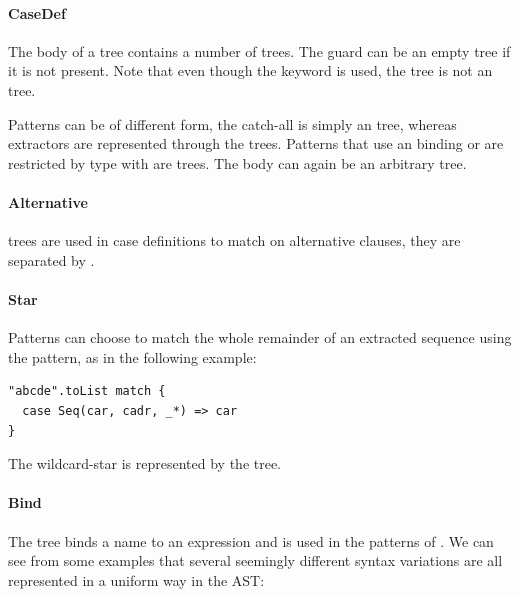 \paragraph{CaseDef} 

\noindent The body of a  tree contains a number of  trees. The guard can be an empty tree if it is not present. Note that even though the  keyword is used, the tree is not an  tree.

Patterns can be of different form, the catch-all \src{\_} is simply an  tree, whereas extractors are represented through the  trees. Patterns that use an  binding or are restricted by type with \src{:} are  trees. The body can again be an arbitrary tree.

\paragraph{Alternative} 

\noindent {} trees are used in case definitions to match on alternative clauses, they are separated by \src{|}.

\paragraph{Star} 

\noindent Patterns can choose to match the whole remainder of an extracted sequence using the \src{\_*} pattern, as in the following example:

\begin{lstlisting}
"abcde".toList match {
  case Seq(car, cadr, _*) => car 
}
\end{lstlisting}

The wildcard-star is represented by the  tree.

\paragraph{Bind} 

\noindent The  tree binds a name to an expression and is used in the patterns of . We can see from some examples that several seemingly different syntax variations are all represented in a uniform way in the AST:

